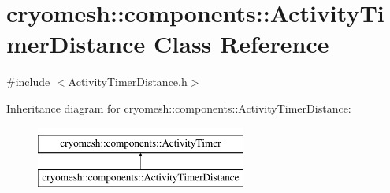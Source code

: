 \hypertarget{classcryomesh_1_1components_1_1ActivityTimerDistance}{\section{cryomesh\-:\-:components\-:\-:\-Activity\-Timer\-Distance \-Class \-Reference}
\label{classcryomesh_1_1components_1_1ActivityTimerDistance}
}


{\ttfamily \#include $<$\-Activity\-Timer\-Distance.\-h$>$}

\-Inheritance diagram for cryomesh\-:\-:components\-:\-:\-Activity\-Timer\-Distance\-:\begin{figure}[H]
\begin{center}
\leavevmode
\includegraphics[height=2.000000cm]{classcryomesh_1_1components_1_1ActivityTimerDistance}
\end{center}
\end{figure}
